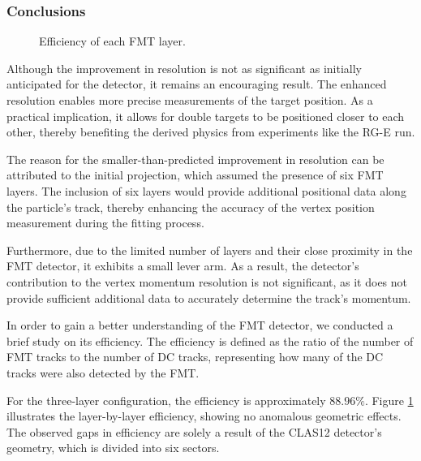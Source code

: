 \subsubsection{Conclusions}
\label{12.44::conclusions}

    \begin{figure}[b]
        \caption[FMT layers efficiency]
        {Efficiency of each FMT layer.}
        \label{fig::12.44::fmt_azimuthal_efficiency}
    \end{figure}

    Although the improvement in resolution is not as significant as initially anticipated for the detector, it remains an encouraging result.
    The enhanced resolution enables more precise measurements of the target position.
    As a practical implication, it allows for double targets to be positioned closer to each other, thereby benefiting the derived physics from experiments like the RG-E run.

    The reason for the smaller-than-predicted improvement in resolution can be attributed to the initial projection, which assumed the presence of six FMT layers.
    The inclusion of six layers would provide additional positional data along the particle's track, thereby enhancing the accuracy of the vertex position measurement during the fitting process.

    Furthermore, due to the limited number of layers and their close proximity in the FMT detector, it exhibits a small lever arm.
    As a result, the detector's contribution to the vertex momentum resolution is not significant, as it does not provide sufficient additional data to accurately determine the track's momentum.

    In order to gain a better understanding of the FMT detector, we conducted a brief study on its efficiency.
    The efficiency is defined as the ratio of the number of FMT tracks to the number of DC tracks, representing how many of the DC tracks were also detected by the FMT.

    For the three-layer configuration, the efficiency is approximately $88.96\%$.
    Figure \ref{fig::12.44::fmt_azimuthal_efficiency} illustrates the layer-by-layer efficiency, showing no anomalous geometric effects.
    The observed gaps in efficiency are solely a result of the CLAS12 detector's geometry, which is divided into six sectors.
